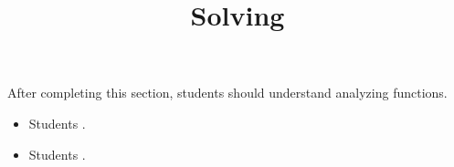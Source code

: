 \documentclass{ximera}
\title{Solving}
\begin{document}
\begin{abstract}
\end{abstract}

\maketitle

\begin{sectionOutcomes}

After completing this section, students should understand analyzing functions. 

\begin{itemize}
\item Students .
\item Students .
\end{itemize}

\end{sectionOutcomes}
\end{document}
